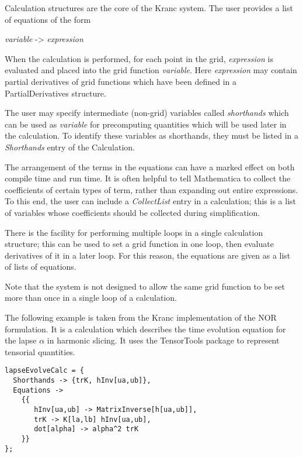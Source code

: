 \documentclass{report}
\begin{document}
Calculation structures are the core of the Kranc system. The user
provides a list of equations of the form

\begin{center}
\begin{minipage}{0.8 \textwidth}
\begin{tt}
{\it variable} -> {\it expression}
\end{tt}
\end{minipage}
\end{center}

When the calculation is performed, for each point in the grid, {\it
expression} is evaluated and placed into the grid function {\it
variable}.  Here {\it expression} may contain partial derivatives of
grid functions which have been defined in a PartialDerivatives
structure.

The user may specify intermediate (non-grid) variables called {\em
shorthands} which can be used as {\em variable} for precomputing
quantities which will be used later in the calculation.  To identify
these variables as shorthands, they must be listed in a {\em
Shorthands} entry of the Calculation.

The arrangement of the terms in the equations can have a marked effect
on both compile time and run time.  It is often helpful to tell
Mathematica to collect the coefficients of certain types of term,
rather than expanding out entire expressions.  To this end, the user
can include a {\em CollectList} entry in a calculation; this is a list
of variables whose coefficients should be collected during
simplification.

There is the facility for performing multiple loops in a single
calculation structure; this can be used to set a grid function in one
loop, then evaluate derivatives of it in a later loop.  For this
reason, the equations are given as a list of lists of equations.

Note that the system is not designed to allow the same grid function
to be set more than once in a single loop of a calculation.

The following example is taken from the Kranc implementation of the
NOR formulation.  It is a calculation which describes the time
evolution equation for the lapse $\alpha$ in harmonic slicing. It uses
the TensorTools package to represent tensorial quantities.

\begin{center}
\begin{minipage}{0.8 \textwidth}
\begin{verbatim}
lapseEvolveCalc = {
  Shorthands -> {trK, hInv[ua,ub]},
  Equations -> 
    {{
       hInv[ua,ub] -> MatrixInverse[h[ua,ub]],
       trK -> K[la,lb] hInv[ua,ub],
       dot[alpha] -> alpha^2 trK
    }}
};
\end{verbatim}
\end{minipage}
\end{center}
\end{document}
